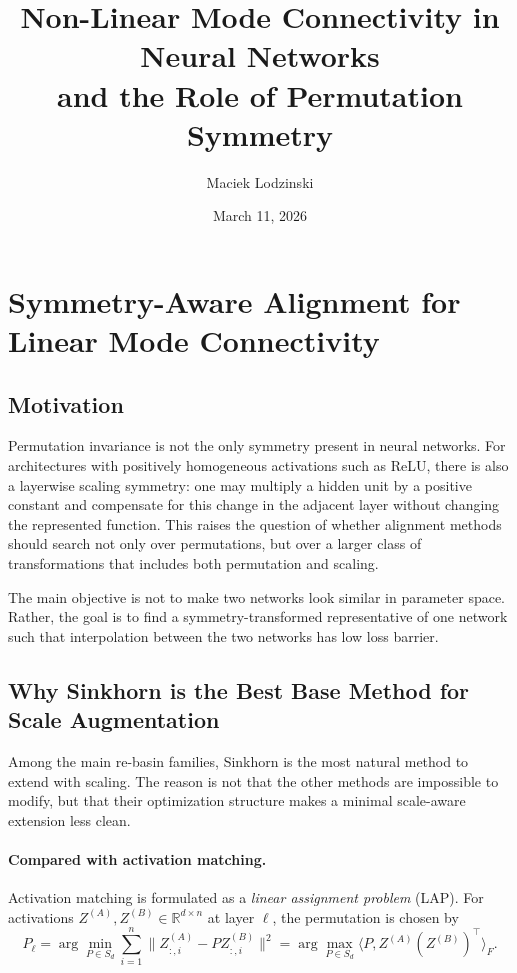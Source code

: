 \documentclass[11pt,a4paper]{article}
\title{Non-Linear Mode Connectivity in Neural Networks\\and the Role of Permutation Symmetry\\ \vspace{0.3cm}}
\author{Maciek Lodzinski}
\date{March 11, 2026}
\begin{document}
\maketitle

\section{Symmetry-Aware Alignment for Linear Mode Connectivity}

\subsection{Motivation}

Permutation invariance is not the only symmetry present in neural networks. For architectures with positively homogeneous activations such as ReLU, there is also a layerwise scaling symmetry: one may multiply a hidden unit by a positive constant and compensate for this change in the adjacent layer without changing the represented function. This raises the question of whether alignment methods should search not only over permutations, but over a larger class of transformations that includes both permutation and scaling.

The main objective is not to make two networks look similar in parameter space. Rather, the goal is to find a symmetry-transformed representative of one network such that interpolation between the two networks has low loss barrier.

\subsection{Why Sinkhorn is the Best Base Method for Scale Augmentation}

Among the main re-basin families, Sinkhorn is the most natural method to extend with scaling. The reason is not that the other methods are impossible to modify, but that their optimization structure makes a minimal scale-aware extension less clean.

\paragraph{Compared with activation matching.}
Activation matching is formulated as a \emph{linear assignment problem} (LAP). For activations \(Z^{(A)}, Z^{(B)} \in \mathbb{R}^{d \times n}\) at layer \(\ell\), the permutation is chosen by
\[
P_\ell
=
\arg\min_{P \in S_d}
\sum_{i=1}^n \|Z^{(A)}_{:,i} - P Z^{(B)}_{:,i}\|^2
=
\arg\max_{P \in S_d}
\langle P, Z^{(A)}(Z^{(B)})^\top \rangle_F.
\]
\end{document}
